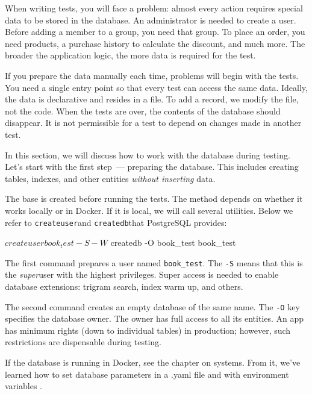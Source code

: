 
When writing tests, you will face a problem: almost every action requires special data to be stored in the database. An administrator is needed to create a user. Before adding a member to a group, you need that group. To place an order, you need products, a purchase history to calculate the discount, and much more. The broader the application logic, the more data is required for the test.

If you prepare the data manually each time, problems will begin with the tests. You need a single entry point so that every test can access the same data. Ideally, the data is declarative and resides in a file. To add a record, we modify the file, not the code. When the tests are over, the contents of the database should disappear. It is not permissible for a test to depend on changes made in another test.

In this section, we will discuss how to work with the database during testing. Let's start with the first step~--- preparing the database. This includes creating tables, indexes, and other entities \emph{without inserting} data.


The base is created before running the tests. The method depends on whether it works locally or in Docker. If it is local, we will call several utilities. Below we refer to \verb|createuser|and \verb|createdb|that PostgreSQL provides:

\begin{english}
  \begin{bash}
$ createuser book_test -S -W
$ createdb -O book_test book_test
  \end{bash}
\end{english}

The first command prepares a user named \verb|book_test|. The \verb|-S| means that this is the \emph{super}user with the highest privileges. Super access is needed to enable database extensions: trigram search, index warm up, and others.

The second command creates an empty database of the same name. The \verb|-O| key specifies the database owner. The owner has full access to all its entities. An app has minimum rights (down to individual tables) in production; however, such restrictions are dispensable during testing.


If the database is running in Docker, see the chapter on systems. From it, we've learned how to set database parameters in a .yaml file and with environment variables .

